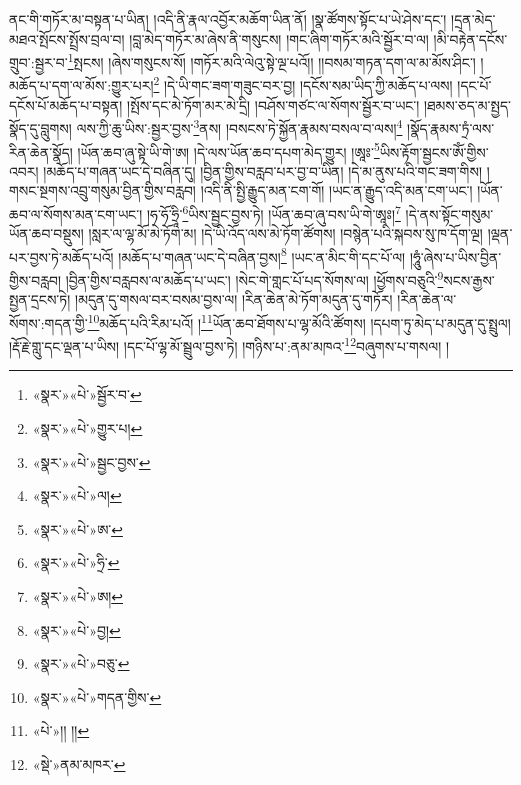 ནང་གི་གཏོར་མ་བསྟན་པ་ཡིན། །འདི་ནི་རྣལ་འབྱོར་མཆོག་ཡིན་ནོ། །སྣ་ཚོགས་སྟོང་པ་ཡེ་ཤེས་དང་། །དྲན་མེད་མཐའ་སྤོངས་སྤྲོས་བྲལ་བ། །བླ་མེད་གཏོར་མ་ཞེས་ནི་གསུངས། །གང་ཞིག་གཏོར་མའི་སྦྱོར་བ་ལ། །མི་བརྟེན་དངོས་གྲུབ་:སྦྱར་བ་\footnote{«སྣར་»«པེ་»སྦྱོར་བ་}སྤངས། །ཞེས་གསུངས་སོ། །གཏོར་མའི་ལེའུ་སྟེ་ལྔ་པའོ།། །།བསམ་གཏན་དག་ལ་མ་མོས་ཤིང་། །མཆོད་པ་དག་ལ་མོས་:གྱུར་པར།\footnote{«སྣར་»«པེ་»གྱུར་པ།} །དེ་ཡི་གང་ཟག་གཟུང་བར་བྱ། །དངོས་སམ་ཡིད་ཀྱི་མཆོད་པ་ལས། །དང་པོ་དངོས་པོ་མཆོད་པ་བསྟན། །སྤོས་དང་མེ་ཏོག་མར་མེ་དྲི། །བཤོས་གཙང་ལ་སོགས་སྦྱོར་བ་ཡང་། །ཐམས་ཅད་མ་སྤྱད་སྣོད་དུ་བླུགས། ལས་ཀྱི་ཆུ་ཡིས་:སྦྱར་བྱས་\footnote{«སྣར་»«པེ་»སྦྱང་བྱས་}ནས། །བསངས་ཏེ་སྐྱོན་རྣམས་བསལ་བ་ལས།\footnote{«སྣར་»«པེ་»ལ།} །སྣོད་རྣམས་ཏྲཾ་ལས་རིན་ཆེན་སྣོད། །ཡོན་ཆབ་ཞུ་སྟེ་ཡི་གེ་ཨ། །དེ་ལས་ཡོན་ཆབ་དཔག་མེད་གྱུར། །ཨཱཿ་\footnote{«སྣར་»«པེ་»ཨ་}ཡིས་རྟོག་སྦྱངས་ཨོཾ་གྱིས་འབར། །མཆོད་པ་གཞན་ཡང་དེ་བཞིན་དུ། །བྱིན་གྱིས་བརླབ་པར་བྱ་བ་ཡིན། །དེ་མ་ནུས་པའི་གང་ཟག་གིས། །གསང་སྔགས་འབྲུ་གསུམ་བྱིན་གྱིས་བརླབ། །འདི་ནི་སྤྱི་རྒྱུད་མན་ངག་གོ། །ཡང་ན་རྒྱུད་འདི་མན་ངག་ཡང་། །ཡོན་ཆབ་ལ་སོགས་མན་ངག་ཡང་། །ཧ་ཧོ་ཧྲཱི་\footnote{«སྣར་»«པེ་»ཧྲི་}ཡིས་སྦྱང་བྱས་ཏེ། །ཡོན་ཆབ་ཞུ་བས་ཡི་གེ་ཨཱཿ།\footnote{«སྣར་»«པེ་»ཨ།} །དེ་ནས་སྟོང་གསུམ་ཡོན་ཆབ་བསྡུས། །སླར་ལ་ལྷ་མོ་མེ་ཏོག་མ། །དེ་ཡི་འོད་ལས་མེ་ཏོག་ཚོགས། །བསྙེན་པའི་སྐབས་སུ་ཁ་དོག་ལྔ། །ལྡན་པར་བྱས་ཏེ་མཆོད་པའོ། །མཆོད་པ་གཞན་ཡང་དེ་བཞིན་བྱས།\footnote{«སྣར་»«པེ་»བྱ།} །ཡང་ན་མིང་གི་དང་པོ་ལ། །ཧཱུཾ་ཞེས་པ་ཡིས་བྱིན་གྱིས་བརླབ། །བྱིན་གྱིས་བརླབས་ལ་མཆོད་པ་ཡང་། །སེང་གེ་གླང་པོ་པད་སོགས་ལ། །ཕྱོགས་བཅུའི་\footnote{«སྣར་»«པེ་»བཅུ་}སངས་རྒྱས་སྤྱན་དྲངས་ཏེ། །མདུན་དུ་གསལ་བར་བསམ་བྱས་ལ། །རིན་ཆེན་མེ་ཏོག་མདུན་དུ་གཏོར། །རིན་ཆེན་ལ་སོགས་:གདན་གྱི་\footnote{«སྣར་»«པེ་»གདན་གྱིས་}མཆོད་པའི་རིམ་པའོ། །\footnote{«པེ་»།། །།}ཡོན་ཆབ་ཐོགས་པ་ལྷ་མོའི་ཚོགས། །དཔག་ཏུ་མེད་པ་མདུན་དུ་སྤྲུལ། །རྡོ་རྗེ་གླུ་དང་ལྡན་པ་ཡིས། །དང་པོ་ལྷ་མོ་སྦྲུལ་བྱས་ཏེ། །གཉིས་པ་:ནམ་མཁའ་\footnote{«སྡེ་»ནམ་མཁར་}བཞུགས་པ་གསལ། །
